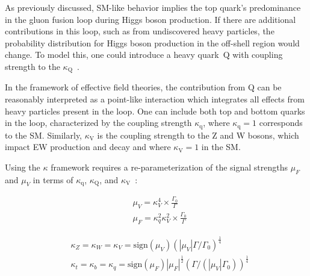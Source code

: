 As previously discussed, SM-like behavior implies the top quark's predominance in the gluon fusion loop during Higgs boson production. If there are additional contributions in this loop, such as from undiscovered heavy particles, the probability distribution for Higgs boson production in the off-shell region would change. To model this, one could introduce a heavy quark~$\mathrm{Q}$ with coupling strength to the \Hboson $\kappa_\mathrm{Q}$~\cite{Gritsan:2020pib,Davis:2021tiv}.

In the framework of effective field theories, the contribution from $\mathrm{Q}$ can be reasonably interpreted as a point-like interaction which integrates all effects from heavy particles present in the loop.
One can include both top and bottom quarks in the loop, characterized by the coupling strength $\kappa_\mathrm{q}$, 
where $\kappa_\mathrm{q}=1$ corresponds to the SM. Similarly, $\kappa_\mathrm{V}$ is the \Hboson coupling strength to the Z and W bosons, which impact EW production and \Hboson decay and where $\kappa_\mathrm{V}=1$ in the SM. 

Using the $\kappa$ framework requires a re-parameterization of the signal strengths $\mu_F$ and $\mu_V$
in terms of $\kappa_\mathrm{q}$, $\kappa_\mathrm{Q}$, and $\kappa_\mathrm{V}$~\cite{Davis:2021tiv}:

\begin{equation}
\begin{aligned}
& \mu_V=\kappa_V^4\times\frac{\Gamma_0}{\Gamma} \\
& \mu_F=\kappa_q^2\kappa_V^2\times\frac{\Gamma_0}{\Gamma}
\end{aligned}
\label{eq:KappaMu}
\end{equation}

\begin{equation}
\begin{aligned}
& \kappa_Z = \kappa_W = \kappa_V= \mathrm{sign}(\mu_V)\left(|\mu_V|\Gamma/\Gamma_0\right)^\frac{1}{4} \\
& \kappa_t = \kappa_b = \kappa_q= \mathrm{sign}(\mu_F)|\mu_F|^\frac{1}{2} \left(\Gamma/(|\mu_V|\Gamma_0)\right)^\frac{1}{4}
\end{aligned}
\label{eq:KappaMu2}
\end{equation}

